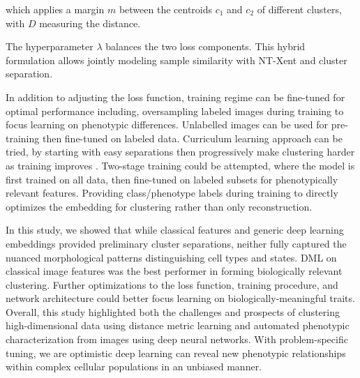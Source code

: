 \documentclass[12pt,a4paper]{article}
\begin{document}
which applies a margin $m$ between the centroids $c_1$ and $c_2$ of different clusters, with $D$ measuring the distance.

The hyperparameter $\lambda$ balances the two loss components. This hybrid formulation allows jointly modeling sample similarity with NT-Xent and cluster separation.

In addition to adjusting the loss function, training regime can be fine-tuned for optimal performance including, oversampling labeled images during training to focus learning on phenotypic differences. Unlabelled images can be used for pre-training then fine-tuned on labeled data. Curriculum learning approach can be tried, by starting with easy separations then progressively make clustering harder as training improves \cite{bengio2009curriculum}. Two-stage training could be attempted, where the model is first trained on all data, then fine-tuned on labeled subsets for phenotypically relevant features. Providing class/phenotype labels during training to directly optimizes the embedding for clustering rather than only reconstruction.

In this study, we showed that while classical features and generic deep learning embeddings provided preliminary cluster separations, neither fully captured the nuanced morphological patterns distinguishing cell types and states. DML on classical image features was the best performer in forming biologically relevant clustering. Further optimizations to the loss function, training procedure, and network architecture could better focus learning on biologically-meaningful traits. Overall, this study highlighted both the challenges and prospects of clustering high-dimensional data using distance metric learning and automated phenotypic characterization from images using deep neural networks. With problem-specific tuning, we are optimistic deep learning can reveal new phenotypic relationships within complex cellular populations in an unbiased manner.

\newpage

    
%
%
%
%
%
%
%
    
\end{document}

